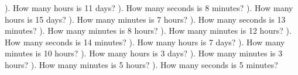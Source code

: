 \documentclass{article}%
\begin{document}
\newline%
\newline%
). How many hours is 11 days?%
\newline%
\newline%
). How many seconds is 8 minutes?%
\newline%
\newline%
). How many hours is 15 days?%
\newline%
\newline%
). How many minutes is 7 hours?%
\newline%
\newline%
). How many seconds is 13 minutes?%
\newline%
\newline%
). How many minutes is 8 hours?%
\newline%
\newline%
). How many minutes is 12 hours?%
\newline%
\newline%
). How many seconds is 14 minutes?%
\newline%
\newline%
). How many hours is 7 days?%
\newline%
\newline%
). How many minutes is 10 hours?%
\newline%
\newline%
). How many hours is 3 days?%
\newline%
\newline%
). How many minutes is 3 hours?%
\newline%
\newline%
). How many minutes is 5 hours?%
\newline%
\newline%
). How many seconds is 5 minutes?%
\newline%
\end{document}
